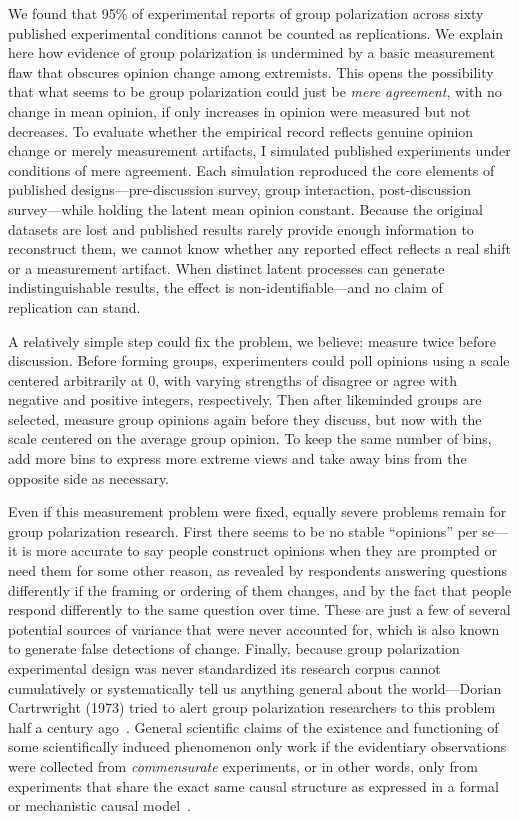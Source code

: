 \documentclass[preview]{article}
\begin{document}
We found that 95\% of experimental reports of group polarization
across sixty published experimental conditions cannot be counted as
replications. We explain here how evidence of group polarization is undermined
by a basic measurement flaw that obscures opinion change among extremists.
This opens the possibility that what seems to be group polarization could just
be \emph{mere agreement}, with no change in mean opinion, if only increases in
opinion were measured but not decreases.  To evaluate whether the empirical
record reflects genuine opinion change or merely measurement artifacts, I
simulated published experiments under conditions of mere agreement. Each
simulation reproduced the core elements of published designs—pre-discussion
survey, group interaction, post-discussion survey—while holding the latent
mean opinion constant. Because the original datasets are lost and published
results rarely provide enough information to reconstruct them, we cannot know
whether any reported effect reflects a real shift or a measurement artifact.
When distinct latent processes can generate indistinguishable results, the
effect is non-identifiable—and no claim of replication can stand.

A relatively simple step could fix the problem, we believe: measure twice
before discussion. Before forming groups, experimenters could poll opinions
using a scale centered arbitrarily at 0, with varying strengths of disagree
or agree with negative and positive integers, respectively. 
Then after likeminded groups are
selected, measure group opinions again before they discuss, but now with the
scale centered on the average group opinion. To keep the same number of bins,
add more bins to express more extreme views and take away bins from
the opposite side as necessary.

Even if this measurement problem were fixed, equally severe problems remain
for group polarization research. First there seems to be no stable 
``opinions'' per
se—it is more accurate to say people construct opinions when they are
prompted or need them for some other reason, as revealed by respondents
answering questions differently if the framing or ordering of them changes,
and by the fact that people respond differently to the same question over
time. These are just a few of several potential sources of variance that were never accounted for, which is also known to generate false detections of change. 
Finally, because group polarization experimental design was never
standardized its research corpus cannot cumulatively or systematically tell 
us anything general about the world—Dorian
Cartrwright (1973) tried to alert group polarization researchers to this
problem half a century ago~\cite{Cartwright1973}. General scientific claims
of the existence and functioning of some scientifically induced phenomenon
only work if the evidentiary observations were collected from
\emph{commensurate} experiments, or in other words, only from experiments
that share the exact same causal structure as expressed in a formal or 
mechanistic causal model~\cite{Cartwright1999}.
\end{document}
